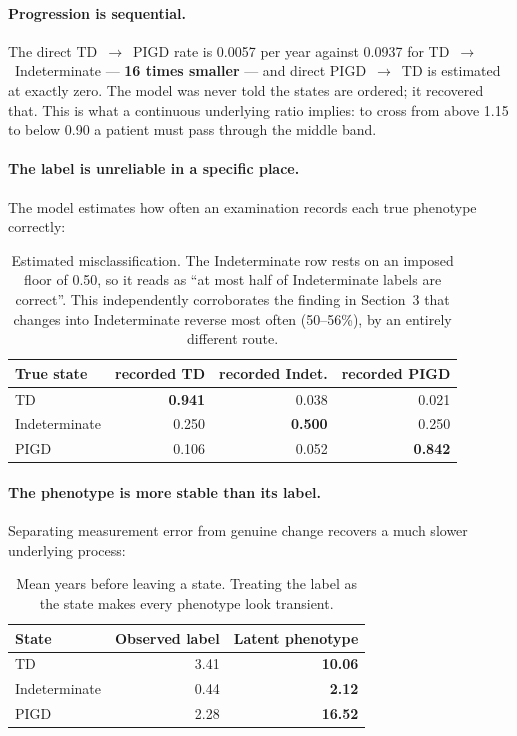 \documentclass[11pt,a4paper]{article}
\newcommand{\arr}{$\rightarrow$}
\begin{document}
\paragraph{Progression is sequential.} The direct TD~\arr~PIGD rate is 0.0057
per year against 0.0937 for TD~\arr~Indeterminate --- \textbf{16 times smaller}
--- and direct PIGD~\arr~TD is estimated at exactly zero. The model was never
told the states are ordered; it recovered that. This is what a continuous
underlying ratio implies: to cross from above 1.15 to below 0.90 a patient must
pass through the middle band.

\paragraph{The label is unreliable in a specific place.} The model estimates how
often an examination records each true phenotype correctly:

\begin{table}[H]
\centering
\begin{tabular}{@{}lrrr@{}}
\toprule
\textbf{True state} & \textbf{recorded TD} & \textbf{recorded Indet.} & \textbf{recorded PIGD} \\
\midrule
TD            & \textbf{0.941} & 0.038 & 0.021 \\
Indeterminate & 0.250 & \textbf{0.500} & 0.250 \\
PIGD          & 0.106 & 0.052 & \textbf{0.842} \\
\bottomrule
\end{tabular}
\caption{Estimated misclassification. The Indeterminate row rests on an imposed
floor of 0.50, so it reads as ``at most half of Indeterminate labels are
correct''. This independently corroborates the finding in Section~3 that changes
into Indeterminate reverse most often (50--56\%), by an entirely different route.}
\end{table}

\paragraph{The phenotype is more stable than its label.} Separating measurement
error from genuine change recovers a much slower underlying process:

\begin{table}[H]
\centering
\begin{tabular}{@{}lrr@{}}
\toprule
\textbf{State} & \textbf{Observed label} & \textbf{Latent phenotype} \\
\midrule
TD            & 3.41 & \textbf{10.06} \\
Indeterminate & 0.44 & \phantom{0}\textbf{2.12} \\
PIGD          & 2.28 & \textbf{16.52} \\
\bottomrule
\end{tabular}
\caption{Mean years before leaving a state. Treating the label as the state
makes every phenotype look transient.}
\end{table}
\end{document}
